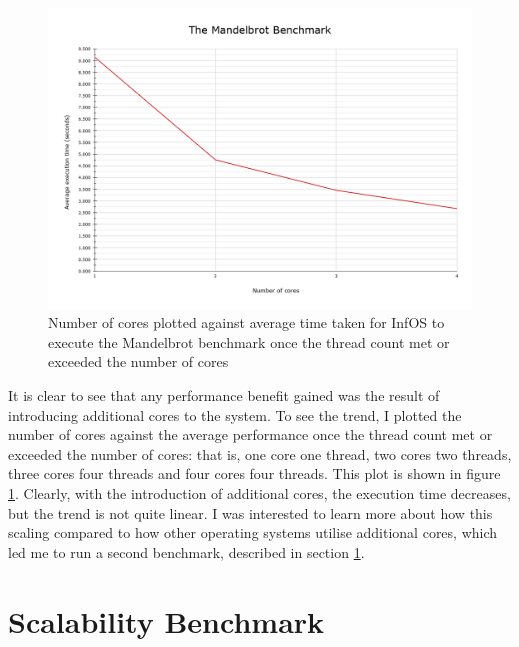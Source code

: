 \documentclass[bsc,frontabs,singlespacing,parskip,deptreport]{infthesis}
\begin{document}
\begin{figure}[h]
    \centering
    \includegraphics[scale=0.35]{figures/mandelbrot-graph.png}
    \caption{Number of cores plotted against average time taken for InfOS to execute the Mandelbrot benchmark once the thread count met or exceeded the number of cores}
    \label{mandelbrot-graph}
\end{figure}

It is clear to see that any performance benefit gained was the result of introducing additional cores to the system. To see the trend, I plotted the number of cores against the average performance once the thread count met or exceeded the number of cores: that is, one core one thread, two cores two threads, three cores four threads and four cores four threads. This plot is shown in figure \ref{mandelbrot-graph}. Clearly, with the introduction of additional cores, the execution time decreases, but the trend is not quite linear. I was interested to learn more about how this scaling compared to how other operating systems utilise additional cores, which led me to run a second benchmark, described in section \ref{mb-mod-benchmark}.

\section{Scalability Benchmark}
\label{mb-mod-benchmark}
\end{document}
